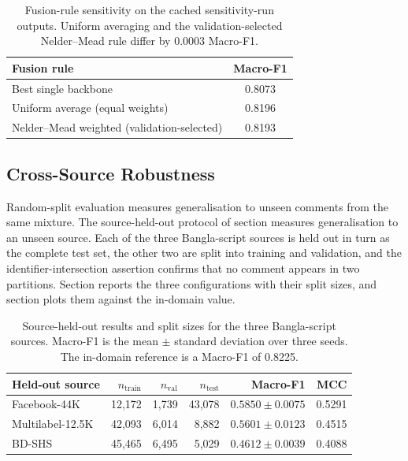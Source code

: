 \documentclass[11pt,a4paper]{article}
\def\Cref#1{Section}%
\def\cref#1{section}%
\begin{document}
\begin{table}[!htbp]
\centering
\caption{Fusion-rule sensitivity on the cached sensitivity-run outputs. Uniform averaging and the validation-selected Nelder--Mead rule differ by 0.0003 Macro-F1.}
\label{tab:fusion}
\small
\begin{tabular}{@{}lc@{}}
\toprule
\textbf{Fusion rule} & \textbf{Macro-F1} \\
\midrule
Best single backbone & 0.8073 \\
Uniform average (equal weights) & 0.8196 \\
Nelder--Mead weighted (validation-selected) & 0.8193 \\
\bottomrule
\end{tabular}
\end{table}


\subsection{Cross-Source Robustness}
\label{sec:robustness-results}

Random-split evaluation measures generalisation to unseen comments from the same mixture. The source-held-out protocol of \cref{sec:splits} measures generalisation to an unseen source. Each of the three Bangla-script sources is held out in turn as the complete test set, the other two are split into training and validation, and the identifier-intersection assertion confirms that no comment appears in two partitions. \Cref{tab:robustness} reports the three configurations with their split sizes, and \cref{fig:robustness} plots them against the in-domain value.

\begin{table}[!htbp]
\centering
\caption{Source-held-out results and split sizes for the three Bangla-script sources. Macro-F1 is the mean $\pm$ standard deviation over three seeds. The in-domain reference is a Macro-F1 of 0.8225.}
\label{tab:robustness}
\small
\begin{tabular}{@{}lrrrrr@{}}
\toprule
\textbf{Held-out source} & \textbf{$n_{\mathrm{train}}$} & \textbf{$n_{\mathrm{val}}$} & \textbf{$n_{\mathrm{test}}$} & \textbf{Macro-F1} & \textbf{MCC} \\
\midrule
Facebook-44K & 12{,}172 & 1{,}739 & 43{,}078 & $0.5850 \pm 0.0075$ & 0.5291 \\
Multilabel-12.5K & 42{,}093 & 6{,}014 & 8{,}882 & $0.5601 \pm 0.0123$ & 0.4515 \\
BD-SHS & 45{,}465 & 6{,}495 & 5{,}029 & $0.4612 \pm 0.0039$ & 0.4088 \\
\bottomrule
\end{tabular}
\end{table}
\end{document}

